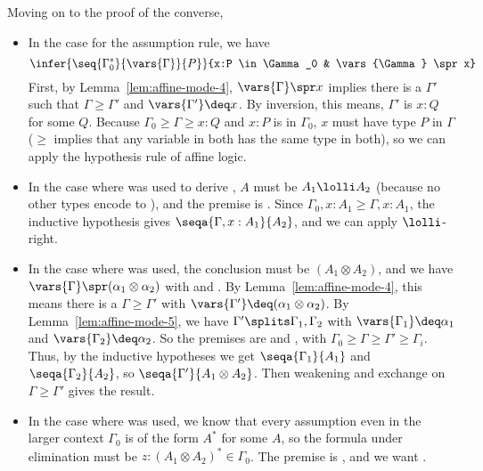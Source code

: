 Moving on to the proof of the converse,

\begin{itemize}
\item In the case for the assumption rule, we have
\[
\infer{\seq{\Gamma_0^*}{\vars{\Gamma}}{P}}
      {x:P \in \Gamma_0 &
       \vars{\Gamma} \spr x}
\]
First, by Lemma~\ref{lem:affine-mode-4}, $\vars{\Gamma} \spr x$ implies
there is a $\Gamma'$ such that $\Gamma \ge \Gamma'$ and $\vars{\Gamma'}
\deq x$.  By inversion, this means, $\Gamma'$ is $x:Q$ for some $Q$.
Because $\Gamma_0 \ge \Gamma \ge x:Q$ and $x:P$ is in $\Gamma_0$, $x$
must have type $P$ in $\Gamma$ ($\ge$ implies that any variable in both
has the same type in both), so we can apply the hypothesis rule of
affine logic.

\item In the case where \UR\/ was used to derive
  , $A$ must be $A_1 \lolli A_2$
  (because no other types encode to \Usymb), and the premise is
  .  Since
  ${\Gamma_0,x:A_1} \ge {\Gamma,x:A_1}$, the inductive hypothesis gives
  $\seqa{\Gamma,x:A_1}{A_2}$, and we can apply $\lolli$-right.

\item In the case where \FR\/ was used, the conclusion must be $(A_1
  \otimes A_2)$, and we have $\vars{\Gamma} \spr (\alpha_1 \otimes
  \alpha_2)$ with  and
  .  By Lemma~\ref{lem:affine-mode-4},
  this means there is a $\Gamma \ge \Gamma'$ with $\vars{\Gamma'} \deq
  (\alpha_1 \otimes \alpha_2)$.  By Lemma~\ref{lem:affine-mode-5}, we
  have $\Gamma' \splits \Gamma_1,\Gamma_2$ with $\vars{\Gamma_1} \deq
  \alpha_1$ and $\vars{\Gamma_2} \deq \alpha_2$. So the premises are
   and
  , with $\Gamma_0 \ge \Gamma
  \ge \Gamma' \ge \Gamma_i$.  Thus, by the inductive hypotheses we get
  $\seqa{\Gamma_1}{A_1}$ and $\seqa{\Gamma_2}{A_2}$, so
  $\seqa{\Gamma'}{A_1 \otimes A_2}$.  Then weakening and exchange on
  $\Gamma \ge \Gamma'$ gives the result.

\item In the case where \FL\/ was used, we know that every assumption
  even in the larger context $\Gamma_0$ is of the form $A^*$ for some
  $A$, so the formula under elimination must be $z:(A_1 \otimes A_2)^*
  \in \Gamma_0$. The premise is
  , and we want .


\end{itemize}
